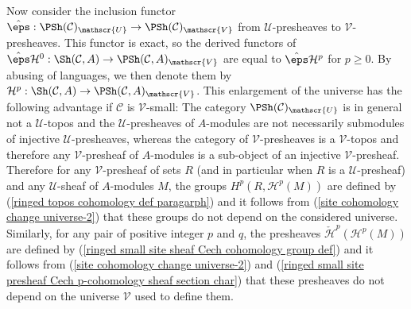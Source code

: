 Now consider the inclusion functor $\hat{\eps}:\PSh(\mathcal{C})_\mathscr{U}\to \PSh(\mathcal{C})_\mathscr{V}$ from $\mathscr{U}$-presheaves to $\mathscr{V}$-presheaves. This functor is exact, so the derived functors of $\hat{\eps}\mathcal{H}^0:\Sh(\mathcal{C},A)\to \PSh(\mathcal{C},A)_\mathscr{V}$ are equal to $\hat{\eps}\mathcal{H}^p$ for $p\geq 0$. By abusing of languages, we then denote them by $\mathcal{H}^p:\Sh(\mathcal{C},A)\to \PSh(\mathcal{C},A)_\mathscr{V}$. This enlargement of the universe has the following advantage if $\mathcal{C}$ is $\mathscr{V}$-small: The category $\PSh(\mathcal{C})_\mathscr{U}$ is in general not a $\mathscr{U}$-topos and the $\mathscr{U}$-presheaves of $A$-modules are not necessarily submodules of injective $\mathscr{U}$-presheaves, whereas the category of $\mathscr{V}$-presheaves is a $\mathscr{V}$-topos and therefore any $\mathscr{V}$-presheaf of $A$-modules is a sub-object of an injective $\mathscr{V}$-presheaf. Therefore for any $\mathscr{V}$-presheaf of sets $R$ (and in particular when $R$ is a $\mathscr{U}$-presheaf) and any $\mathscr{U}$-sheaf of $A$-modules $M$, the groups $H^p(R,\mathcal{H}^p(M))$ are defined by (\ref{ringed topos cohomology def paragarph}) and it follows from (\ref{site cohomology change universe-2}) that these groups do not depend on the considered universe. Similarly, for any pair of positive integer $p$ and $q$, the presheaves $\check{\mathcal{H}}^p(\mathcal{H}^p(M))$ are defined by (\ref{ringed small site sheaf Cech cohomology group def}) and it follows from (\ref{site cohomology change universe-2}) and (\ref{ringed small site presheaf Cech p-cohomology sheaf section char}) that these presheaves do not depend on the universe $\mathscr{V}$ used to define them.

